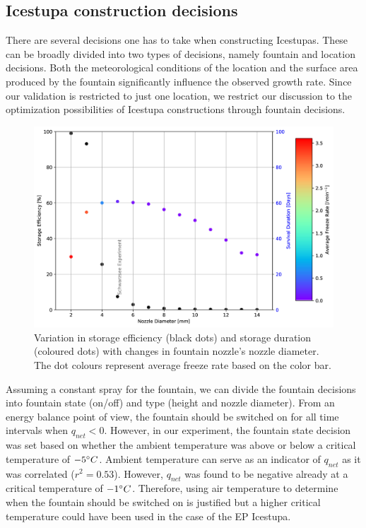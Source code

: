 \documentclass[utf8]{frontiersSCNS} %
\begin{document}
\subsection{Icestupa construction decisions} There are several decisions one has to take when constructing Icestupas.
These can be broadly divided into two types of decisions, namely fountain and location decisions.  Both the
meteorological conditions of the location and the surface area produced by the fountain significantly influence the
observed growth rate. Since our validation is restricted to just one location, we restrict our discussion to the
optimization possibilities of Icestupa constructions through fountain decisions.

  \begin{figure} \begin{center} \includegraphics[width=15 cm]{Figures/Figure_10.jpg} \end{center} \caption{Variation
in storage efficiency (black dots) and storage duration (coloured dots) with changes in fountain nozzle's nozzle
diameter.  The dot colours represent average freeze rate based on the color bar.} \label{fig:dia_f} \end{figure}
  

Assuming a constant spray for the fountain, we can divide the fountain decisions into fountain state (on/off) and type
(height and nozzle diameter).  From an energy balance point of view, the fountain should be switched on for all time
intervals when $q_{net} < 0$. However, in our experiment, the fountain state decision was set based on whether the
ambient temperature was above or below a critical temperature of $-5 \degree C$. Ambient temperature can serve as an
indicator of $q_{net}$ as it was correlated ($r^2 = 0.53$).  However, $q_{net}$ was found to be negative already at a
critical temperature of $-1 \degree C$. Therefore, using air temperature to determine when the fountain should be
switched on is justified but a higher critical temperature could have been used in the case of the EP
Icestupa. 
\end{document}
